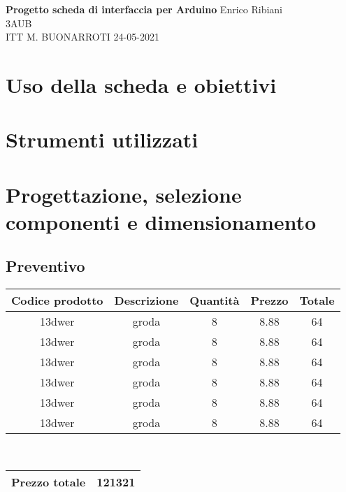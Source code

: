 \documentclass{article}
\begin{document}
    \begin{titlepage}
\begin{flushleft}
\vspace{3\baselineskip}

\Huge{\textbf{Progetto scheda di interfaccia per Arduino}}
\vfill
\LARGE Enrico Ribiani\\
\LARGE 3AUB\\
\vfill
\huge{ITT M. BUONARROTI 24-05-2021}

\end{flushleft}
\end{titlepage}
\pagestyle{fancy}
\fancyhead{}


\tableofcontents
\vskip 3cm

\section{Uso della scheda e obiettivi}
\section{Strumenti utilizzati}
\section{Progettazione, selezione componenti e dimensionamento}
    \subsection{Preventivo}
        \begin{center}
        \begin{tabular}{| c | c | c | c| c |} 
        \hline
        \rowcolor{BurntOrange} Codice prodotto & Descrizione & Quantità & Prezzo & Totale\\ [0.5ex] 
        \hline
        \rowcolor{Peach} 13dwer & groda & 8 & 8.88 & 64\\
        \hline
        \rowcolor{Apricot} 13dwer & groda & 8 & 8.88 & 64\\
        \hline
        \rowcolor{Peach} 13dwer & groda & 8 & 8.88 & 64\\
        \hline
        \rowcolor{Apricot}13dwer & groda & 8 & 8.88 & 64\\
        \hline
        \rowcolor{Peach} 13dwer & groda & 8 & 8.88 & 64\\
        \hline
        \rowcolor{Apricot} 13dwer & groda & 8 & 8.88 & 64\\
        \hline
   \end{tabular}
   \\
   \vskip 2mm
   \begin{tabular}[h]{|c|c|}
       \hline
        \rowcolor{BurntOrange} Prezzo totale & 121321\\
       \hline
   \end{tabular}
   \end{center}
\end{document}
